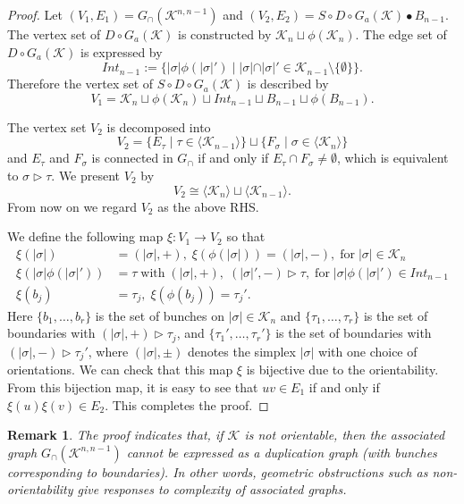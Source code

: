 \documentclass[a4paper,12pt]{article}
\newtheorem{remark}[definition]{Remark}
\newcommand{\bra}{\langle}
\newcommand{\ket}{\rangle}
\numberwithin{equation}{section}
\begin{document}
%
%
\begin{proof}
Let $(V_1,E_1) = G_{\cap}(\mathcal{K}^{n,n-1})$ and $(V_2,E_2) = S\circ D\circ G_{a}(\mathcal{K}) \bullet B_{n-1}$. 
The vertex set of $D\circ G_a(\mathcal{K})$ is constructed by $\mathcal{K}_n \sqcup \phi(\mathcal{K}_n)$. 
The edge set of $D\circ G_a(\mathcal{K})$ is expressed by
	\[  Int_{n-1}:=\{|\sigma|\phi(|\sigma|') \; |\; |\sigma|\cap |\sigma|' \in \mathcal{K}_{n-1}\setminus \{\emptyset\} \}. \]
Therefore the vertex set of $S\circ D\circ G_a(\mathcal{K})$ is described by 
	\[ V_1=\mathcal{K}_n \sqcup \phi(\mathcal{K}_n) \sqcup Int_{n-1} \sqcup B_{n-1} \sqcup \phi(B_{n-1}). \]
%
\par
The vertex set $V_2$ is decomposed into 
	\[ V_2=\{ E_\tau \;|\; \tau\in \bra \mathcal{K}_{n-1} \ket \} \sqcup \{ F_\sigma \;|\; \sigma\in \bra \mathcal{K}_n \ket \} \]
and $E_\tau$ and $F_\sigma$ is connected in $G_\cap$ if and only if $E_\tau \cap F_\sigma \neq \emptyset$, which is 
equivalent to $\sigma\triangleright \tau$. 
We present $V_2$ by
\begin{equation*}
V_2\cong \bra \mathcal{K}_n \ket \sqcup \bra \mathcal{K}_{n-1} \ket.
\end{equation*}
From now on we regard $V_2$ as the above RHS. 
%
\par
We define the following map $\xi:V_1\to V_2$ so that 
\begin{align*}
        \xi(|\sigma|) &= (|\sigma|,+),\; \xi(\phi(|\sigma|)) = (|\sigma|,-), \; \mathrm{for} \; |\sigma|\in \mathcal{K}_n\\
        \xi(|\sigma|\phi(|\sigma|')) &= \tau \;\mathrm{with}\; (|\sigma|,+),\; (|\sigma|',-)\triangleright \tau, \; \mathrm{for} \; |\sigma|\phi(|\sigma|')\in Int_{n-1} \\
        \xi(b_j) &= \tau_j,\; \xi(\phi(b_j)) = \tau_j'.
\end{align*}
Here $\{b_1,\dots,b_r\}$ is the set of bunches on $|\sigma|\in \mathcal{K}_n$ and 
$\{\tau_1,\dots,\tau_r\}$ is the set of boundaries with $(|\sigma|,+)\triangleright \tau_j$, and 
$\{\tau_1',\dots,\tau_r'\}$ is the set of boundaries with $(|\sigma|,-)\triangleright \tau_j'$, where $(|\sigma|, \pm)$ denotes the simplex $|\sigma|$ with one choice of orientations. 
We can check that this map $\xi$ is bijective due to the orientability. 
From this bijection map, it is easy to see that $uv\in E_1$ if and only if $\xi(u)\xi(v)\in E_2$. 
This completes the proof. 
\end{proof}
%
\begin{remark}
The proof indicates that, if $\mathcal{K}$ is not orientable, then the associated graph $G_\cap (\mathcal{K}^{n,n-1})$ cannot be expressed as a duplication graph (with bunches corresponding to boundaries).
In other words, geometric obstructions such as non-orientability give responses to complexity of associated graphs.
\end{remark}
\end{document}
